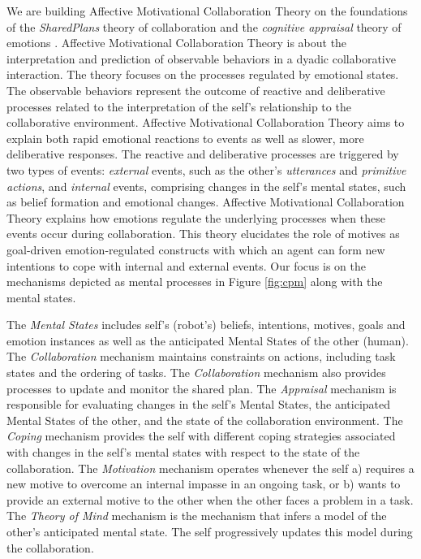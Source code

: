 \documentclass[letterpaper]{article}
\begin{document}
We are building Affective Motivational Collaboration Theory on the foundations
of the \textit{SharedPlans} theory of collaboration \cite{grosz:plans-discourse}
and the \textit{cognitive appraisal} theory of emotions
\cite{gratch:domain-independent}. Affective Motivational Collaboration Theory is
about the interpretation and prediction of observable behaviors in a dyadic
collaborative interaction. The theory focuses on the processes regulated by
emotional states. The observable behaviors represent the outcome of reactive and
deliberative processes related to the interpretation of the self's relationship
to the collaborative environment. Affective Motivational Collaboration Theory
aims to explain both rapid emotional reactions to events as well as slower, more
deliberative responses. The reactive and deliberative processes are triggered by
two types of events: \textit{external} events, such as the other's
\textit{utterances} and \textit{primitive actions}, and \textit{internal}
events, comprising changes in the self's mental states, such as belief formation
and emotional changes. Affective Motivational Collaboration Theory explains how
emotions regulate the underlying processes when these events occur during
collaboration. This theory elucidates the role of motives as goal-driven
emotion-regulated constructs with which an agent can form new intentions to cope
with internal and external events. Our focus is on the mechanisms depicted as
mental processes in Figure \ref{fig:cpm} along with the mental states.

The \textit{Mental States} includes self's (robot's) beliefs, intentions,
motives, goals and emotion instances as well as the anticipated Mental States of
the other (human). The \textit{Collaboration} mechanism maintains constraints on
actions, including task states and the ordering of tasks. The
\textit{Collaboration} mechanism also provides processes to update and monitor
the shared plan. The \textit{Appraisal} mechanism is responsible for evaluating
changes in the self's Mental States, the anticipated Mental States of the other,
and the state of the collaboration environment. The \textit{Coping} mechanism
provides the self with different coping strategies associated with changes in
the self's mental states with respect to the state of the collaboration. The
\textit{Motivation} mechanism operates whenever the self a) requires a new
motive to overcome an internal impasse in an ongoing task, or b) wants to
provide an external motive to the other when the other faces a problem in a
task. The \textit{Theory of Mind} mechanism is the mechanism that infers a model
of the other's anticipated mental state. The self progressively updates this
model during the collaboration.
\end{document}
